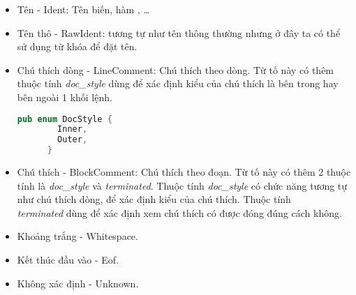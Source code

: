 \begin{itemize}
\begin{itemize}
    \end{itemize}
  \item Tên - Ident: Tên biến, hàm , \dots
  \item Tên thô - RawIdent: tương tự như tên thông thường nhưng ở đây ta có thể sử dụng 
        từ khóa để đặt tên.
  \item Chú thích dòng - LineComment: Chú thích theo dòng. Từ tố này có thêm thuộc tính 
  \textit{doc\_style} dùng để xác định kiểu của chú thích là bên trong hay bên ngoài 1 
  khối lệnh.
    \begin{lstlisting}[language=Rust]
      pub enum DocStyle {
        Inner,
        Outer,
      }
    \end{lstlisting}
  \item Chú thích - BlockComment:  Chú thích theo đoạn. Từ tố này có thêm 2 thuộc tính là
  \textit{doc\_style} và \textit{terminated}. Thuộc tính \textit{doc\_style} có chức năng
  tương tự như chú thích dòng, để xác định kiểu của chú thích. Thuộc tính \\ \textit{terminated}
  dùng để xác định xem chú thích có được đóng đúng cách không.
  \item Khoảng trắng - Whitespace.
  \item Kết thúc đầu vào - Eof.
  \item Không xác định - Unknown.
\end{itemize}

